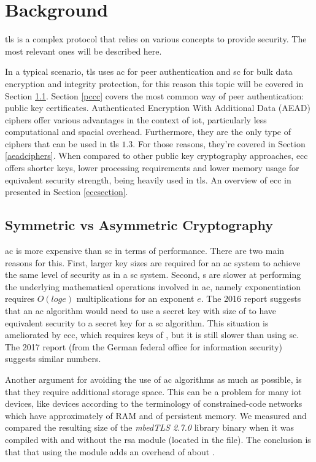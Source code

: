 \documentclass{llncs}
\begin{document}
\section{Background}

\gls{tls} is a complex protocol that relies on various concepts to provide
security. The most relevant ones will be described here.

In a typical scenario, \gls{tls} uses \gls{ac} for peer authentication and \gls{sc} for bulk data
encryption and integrity protection, for this reason this topic will be covered in Section \ref{sac}. Section \ref{pccc} covers the most common way of peer authentication: public key certificates. Authenticated Encryption With Additional Data (AEAD) ciphers offer various advantages in the
context of \gls{iot}, particularly less computational and spacial overhead.
Furthermore, they are the only type of ciphers that can be used in \gls{tls}
$1.3$. For those reasons, they're covered in Section \ref{aeadciphers}.
When compared to other public key cryptography approaches, \gls{ecc} offers shorter keys, lower processing requirements and lower memory usage for equivalent security strength, being heavily used
in \gls{tls}. An overview of \gls{ecc} in presented in Section \ref{eccsection}.


\subsection{Symmetric vs Asymmetric Cryptography} \label{sac}

\gls{ac} is more expensive than \gls{sc} in terms of performance. There are two main reasons for this. First, larger key sizes are required for an \gls{ac} system to achieve the
same level of security as in a \gls{sc} system. Second, s are slower at performing the underlying
mathematical operations involved in \gls{ac}, namely exponentiation requires
$O(log e)$ multiplications for an exponent $e$. The 2016  report \cite{Recommen44:online}
suggests that an \gls{ac} algorithm would need to use a secret key with size of 
to have equivalent security to a  secret key for a \gls{sc} algorithm.
This situation is ameliorated by \gls{ecc}, which requires keys of , but
it is still slower than using \gls{sc}. The 2017  report \cite{Kryptogr1:online} (from the
German federal office for information security) suggests similar numbers.

Another argument for avoiding the use of \gls{ac}
algorithms as much as possible, is that they require additional storage space. This can be a problem for many \gls{iot} devices,
like  devices according to the terminology of constrained-code
networks\cite{RFC7228} which have approximately  of RAM and 
of persistent memory. We measured and compared the resulting size of the \textit{mbedTLS 2.7.0} library\cite{SSLLibra13:online} binary when it was compiled with and without the \gls{rsa} module
(located in the  file). The conclusion is that that using the  module adds an overhead of about .
\end{document}
